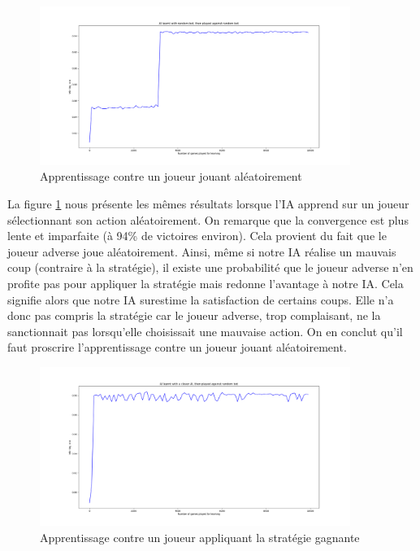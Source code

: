 \begin{figure}[h]
 \centering
 \includegraphics[width=0.9\textwidth]{img/learnRandomly.png}
 \caption{Apprentissage contre un joueur jouant aléatoirement}
 \label{fig:learnRandomly}
\end{figure}

La figure \ref{fig:learnRandomly} nous présente les mêmes résultats lorsque l'IA apprend sur un joueur sélectionnant son action aléatoirement. On remarque que la convergence
est plus lente et imparfaite (à 94\% de victoires environ). Cela provient du fait que le joueur adverse joue aléatoirement. Ainsi, même si notre IA réalise un mauvais 
coup (contraire à la stratégie), il existe une probabilité que le joueur adverse n'en profite pas pour appliquer la stratégie mais redonne l'avantage à notre IA. Cela
signifie alors que notre IA surestime la satisfaction de certains coups. Elle n'a donc pas compris la stratégie car le joueur adverse, trop complaisant, ne la
sanctionnait pas lorsqu'elle choisissait une mauvaise action. On en conclut qu'il faut proscrire l'apprentissage contre un joueur jouant aléatoirement.

\begin{figure}[h]
 \centering
 \includegraphics[width=0.9\textwidth]{img/learnWithGod.png}
 \caption{Apprentissage contre un joueur appliquant la stratégie gagnante}
 \label{fig:learnWithGod}
\end{figure}


